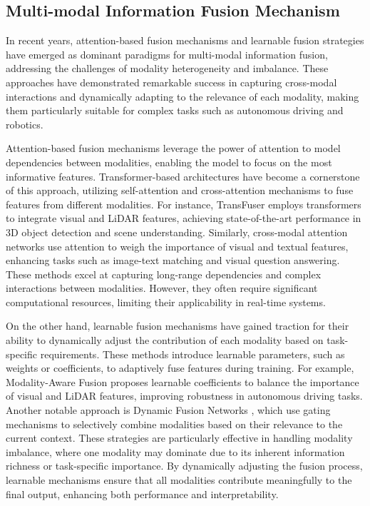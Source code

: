 \subsection{Multi-modal Information Fusion Mechanism}
In recent years, attention-based fusion mechanisms and learnable fusion strategies have emerged as dominant paradigms for multi-modal information fusion, addressing the challenges of modality heterogeneity and imbalance. These approaches have demonstrated remarkable success in capturing cross-modal interactions and dynamically adapting to the relevance of each modality, making them particularly suitable for complex tasks such as autonomous driving and robotics.

Attention-based fusion mechanisms leverage the power of attention to model dependencies between modalities, enabling the model to focus on the most informative features. Transformer-based architectures \cite{vaswani2017attention, han2022survey} have become a cornerstone of this approach, utilizing self-attention and cross-attention mechanisms to fuse features from different modalities. For instance, TransFuser \cite{chitta2022transfuser} employs transformers to integrate visual and LiDAR features, achieving state-of-the-art performance in 3D object detection and scene understanding. Similarly, cross-modal attention networks \cite{xu2020cross} use attention to weigh the importance of visual and textual features, enhancing tasks such as image-text matching and visual question answering. These methods excel at capturing long-range dependencies and complex interactions between modalities. However, they often require significant computational resources, limiting their applicability in real-time systems.

On the other hand, learnable fusion mechanisms have gained traction for their ability to dynamically adjust the contribution of each modality based on task-specific requirements. These methods introduce learnable parameters, such as weights or coefficients, to adaptively fuse features during training. For example, Modality-Aware Fusion \cite{liu2024cross} proposes learnable coefficients to balance the importance of visual and LiDAR features, improving robustness in autonomous driving tasks. Another notable approach is Dynamic Fusion Networks \cite{xue2023dynamic}, which use gating mechanisms to selectively combine modalities based on their relevance to the current context. These strategies are particularly effective in handling modality imbalance, where one modality may dominate due to its inherent information richness or task-specific importance. By dynamically adjusting the fusion process, learnable mechanisms ensure that all modalities contribute meaningfully to the final output, enhancing both performance and interpretability.

